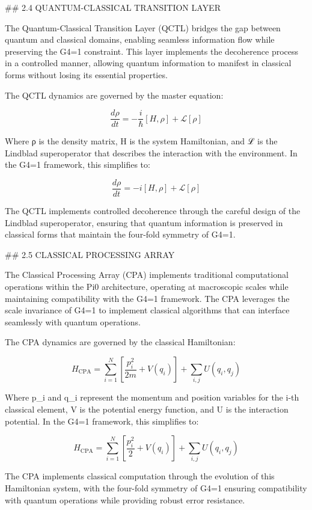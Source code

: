 ## 2.4 QUANTUM-CLASSICAL TRANSITION LAYER

The Quantum-Classical Transition Layer (QCTL) bridges the gap between quantum and classical domains, enabling seamless information flow while preserving the G4=1 constraint. This layer implements the decoherence process in a controlled manner, allowing quantum information to manifest in classical forms without losing its essential properties.

The QCTL dynamics are governed by the master equation:

$$\frac{d\rho}{dt} = -\frac{i}{\hbar}[H, \rho] + \mathcal{L}[\rho]$$

Where ρ is the density matrix, H is the system Hamiltonian, and ℒ is the Lindblad superoperator that describes the interaction with the environment. In the G4=1 framework, this simplifies to:

$$\frac{d\rho}{dt} = -i[H, \rho] + \mathcal{L}[\rho]$$

The QCTL implements controlled decoherence through the careful design of the Lindblad superoperator, ensuring that quantum information is preserved in classical forms that maintain the four-fold symmetry of G4=1.

## 2.5 CLASSICAL PROCESSING ARRAY

The Classical Processing Array (CPA) implements traditional computational operations within the Pi0 architecture, operating at macroscopic scales while maintaining compatibility with the G4=1 framework. The CPA leverages the scale invariance of G4=1 to implement classical algorithms that can interface seamlessly with quantum operations.

The CPA dynamics are governed by the classical Hamiltonian:

$$H_{\text{CPA}} = \sum_{i=1}^N \left[ \frac{p_i^2}{2m} + V(q_i) \right] + \sum_{i,j} U(q_i, q_j)$$

Where p_i and q_i represent the momentum and position variables for the i-th classical element, V is the potential energy function, and U is the interaction potential. In the G4=1 framework, this simplifies to:

$$H_{\text{CPA}} = \sum_{i=1}^N \left[ \frac{p_i^2}{2} + V(q_i) \right] + \sum_{i,j} U(q_i, q_j)$$

The CPA implements classical computation through the evolution of this Hamiltonian system, with the four-fold symmetry of G4=1 ensuring compatibility with quantum operations while providing robust error resistance.

